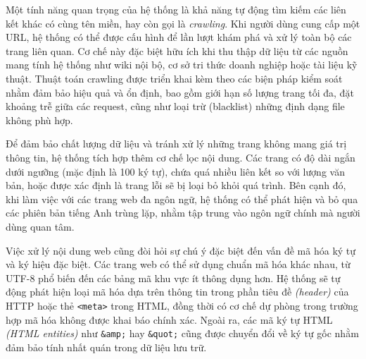 Một tính năng quan trọng của hệ thống là khả năng tự động tìm kiếm các liên kết khác có cùng tên miền, hay còn gọi là \emph{crawling}. Khi người dùng cung cấp một URL, hệ thống có thể được cấu hình để lần lượt khám phá và xử lý toàn bộ các trang liên quan. Cơ chế này đặc biệt hữu ích khi thu thập dữ liệu từ các nguồn mang tính hệ thống như wiki nội bộ, cơ sở tri thức doanh nghiệp hoặc tài liệu kỹ thuật. Thuật toán crawling được triển khai kèm theo các biện pháp kiểm soát nhằm đảm bảo hiệu quả và ổn định, bao gồm giới hạn số lượng trang tối đa, đặt khoảng trễ giữa các request, cũng như loại trừ (blacklist) những định dạng file không phù hợp.

Để đảm bảo chất lượng dữ liệu và tránh xử lý những trang không mang giá trị thông tin, hệ thống tích hợp thêm cơ chế lọc nội dung. Các trang có độ dài ngắn dưới ngưỡng (mặc định là 100 ký tự), chứa quá nhiều liên kết so với lượng văn bản, hoặc được xác định là trang lỗi sẽ bị loại bỏ khỏi quá trình. Bên cạnh đó, khi làm việc với các trang web đa ngôn ngữ, hệ thống có thể phát hiện và bỏ qua các phiên bản tiếng Anh trùng lặp, nhằm tập trung vào ngôn ngữ chính mà người dùng quan tâm.

Việc xử lý nội dung web cũng đòi hỏi sự chú ý đặc biệt đến vấn đề mã hóa ký tự và ký hiệu đặc biệt. Các trang web có thể sử dụng chuẩn mã hóa khác nhau, từ UTF-8 phổ biến đến các bảng mã khu vực ít thông dụng hơn. Hệ thống sẽ tự động phát hiện loại mã hóa dựa trên thông tin trong phần tiêu đề \emph{(header)} của HTTP hoặc thẻ \texttt{<meta>} trong HTML, đồng thời có cơ chế dự phòng trong trường hợp mã hóa không được khai báo chính xác. Ngoài ra, các mã ký tự HTML \emph{(HTML entities)} như \texttt{\&amp;} hay \texttt{\&quot;} cũng được chuyển đổi về ký tự gốc nhằm đảm bảo tính nhất quán trong dữ liệu lưu trữ.